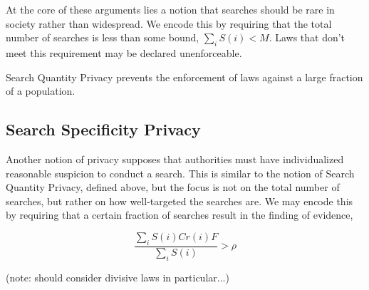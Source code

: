 At the core of these arguments lies a notion that searches should be rare in society rather than widespread.  We encode this by requiring that the total number of searches is less than some bound, $\sum_i S(i) < M$.  Laws that don't meet this requirement may be declared unenforceable.

Search Quantity Privacy prevents the enforcement of laws against a large fraction of a population.


\subsection{Search Specificity Privacy}

Another notion of privacy supposes that authorities must have individualized reasonable suspicion to conduct a search.  This is similar to the notion of Search Quantity Privacy, defined above, but the focus is not on the total number of searches, but rather on how well-targeted the searches are.  We may encode this by requiring that a certain fraction of searches result in the finding of evidence,

$$\frac{\sum_i S(i)Cr(i)F}{\sum_i S(i)} > \rho$$



(note: should consider divisive laws in particular...)

